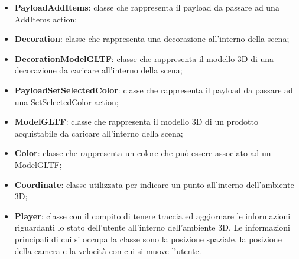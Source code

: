 \begin{itemize}
\begin{itemize}
			\item \textbf{PayloadAddItems}: classe che rappresenta il payload da passare ad una AddItems action;
			\item \textbf{Decoration}: classe che rappresenta una decorazione all'interno della scena;
			\item \textbf{DecorationModelGLTF}: classe che rappresenta il modello 3D di una decorazione da caricare all'interno della scena;
			\item \textbf{PayloadSetSelectedColor}: classe che rappresenta il payload da passare ad una SetSelectedColor action;
			\item \textbf{ModelGLTF}: classe che rappresenta il modello 3D di un prodotto acquistabile da caricare all'interno della scena;
			\item \textbf{Color}: classe che rappresenta un colore che può essere associato ad un ModelGLTF; 
			\item \textbf{Coordinate}: classe utilizzata per indicare un punto all'interno dell'ambiente 3D;
			\item \textbf{Player}: classe con il compito di tenere traccia ed aggiornare le informazioni riguardanti 
			lo stato dell'utente all'interno dell'ambiente 3D.
			Le informazioni principali di cui si occupa la classe sono la posizione spaziale, la posizione della camera e
			la velocità con cui si muove l'utente.
		\end{itemize}
		

\end{itemize}

